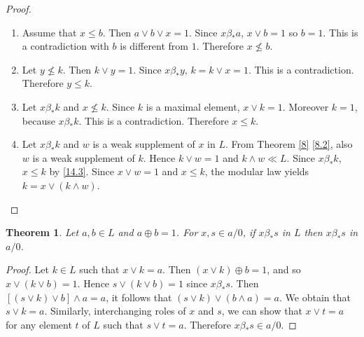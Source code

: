\documentclass[a4paper,12pt]{article}
\newtheorem{theorem}{Theorem}[section]
\numberwithin{equation}{section}
\begin{document}
\begin{proof}
  \begin{enumerate}
    \item
      Assume that $ x \leq b $. Then $ a \vee b \vee x = 1 $. Since $ x \beta_* a $, $ x \vee b = 1 $ so $ b = 1 $. 
      This is a contradiction with $ b $ is different from $ 1 $. 
      Therefore $ x \not\le b $.
    \item
      Let $ y \not\le k $. Then $ k \vee y = 1 $. Since $ x \beta_* y $, $ k = k \vee x = 1 $. This is a contradiction. 
      Therefore $ y \leq k $.
    \item
      Let $ x \beta_* k $ and $ x \not\le k $. Since $ k $ is a maximal element, $ x \vee k = 1 $. Moreover $ k = 1 $, 
      because $ x \beta_* k $. This is a contradiction. Therefore $ x \leq k $.
    \item
      Let $ x \beta_* k $ and $ w $ is a weak supplement of $ x $ in $ L $. From Theorem \ref{8} \ref{8.2}, 
      also $ w $ is a weak supplement of $ k $. Hence $ k \vee w = 1 $ and $ k \wedge w \ll L $. 
      Since $ x \beta_* k $, $ x \leq k $ by \ref{14.3}. Since $ x \vee w = 1 $ 
      and $ x \leq k $, the modular law yields $ k = x \vee ( k \wedge w ) $.
  \end{enumerate}
\end{proof}


\begin{theorem}\label{15}
  Let $ a, b \in L $ and $ a \oplus b = 1 $. For $ x,s \in a/0 $, if $ x \beta_* s $ in $ L $ then $ x \beta_* s $ in $ a/0 $.
\end{theorem}

\begin{proof}
  Let $ k \in L $ such that $ x \vee k = a $. Then $ (x \vee k ) \oplus b = 1 $, and so $ x \vee ( k \vee b ) = 1 $. 
  Hence $ s \vee ( k \vee b ) = 1 $ since $ x \beta_* s $. Then $ \left[ (s \vee k ) \vee b \right] \wedge a = a $, 
  it follows that $ ( s \vee k ) \vee ( b \wedge a ) = a $. We obtain that $ s \vee k = a $. Similarly, interchanging 
  roles of $ x $ and $ s $, we can show that $ x \vee t = a $ for any element $ t $ of $ L $ such that $ s \vee t = a $. 
  Therefore $ x \beta_* s \in a/0 $.
\end{proof}
\end{document}
